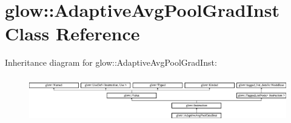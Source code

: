 \hypertarget{classglow_1_1_adaptive_avg_pool_grad_inst}{}\section{glow\+:\+:Adaptive\+Avg\+Pool\+Grad\+Inst Class Reference}
\label{classglow_1_1_adaptive_avg_pool_grad_inst}
Inheritance diagram for glow\+:\+:Adaptive\+Avg\+Pool\+Grad\+Inst\+:\begin{figure}[H]
\begin{center}
\leavevmode
\includegraphics[height=1.991111cm]{classglow_1_1_adaptive_avg_pool_grad_inst}
\end{center}
\end{figure}
